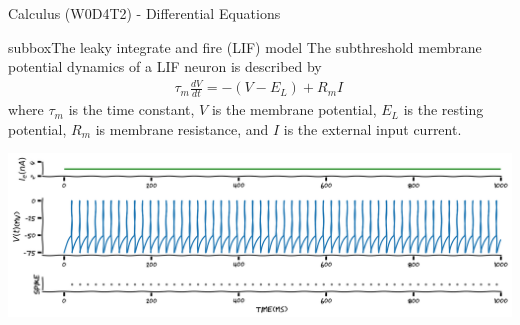 \begin{textbox}{Calculus (W0D4T2) - Differential Equations}
\begin{subbox}{subbox}{The leaky integrate and fire (LIF) model}
The subthreshold membrane potential dynamics of a LIF neuron is described by
\begin{align}
\tau_m\frac{dV}{dt} = -(V-E_L) + R_mI\,
\end{align}
where $\tau_m$ is the time constant, $V$ is the membrane potential,  $E_L$ is the resting potential, $R_m$ is membrane resistance, and $I$ is the external input current. 

\centering
\includegraphics[scale=0.2]{Figures/PreCourse/CFigure6.png}
\end{subbox}
\end{textbox}

